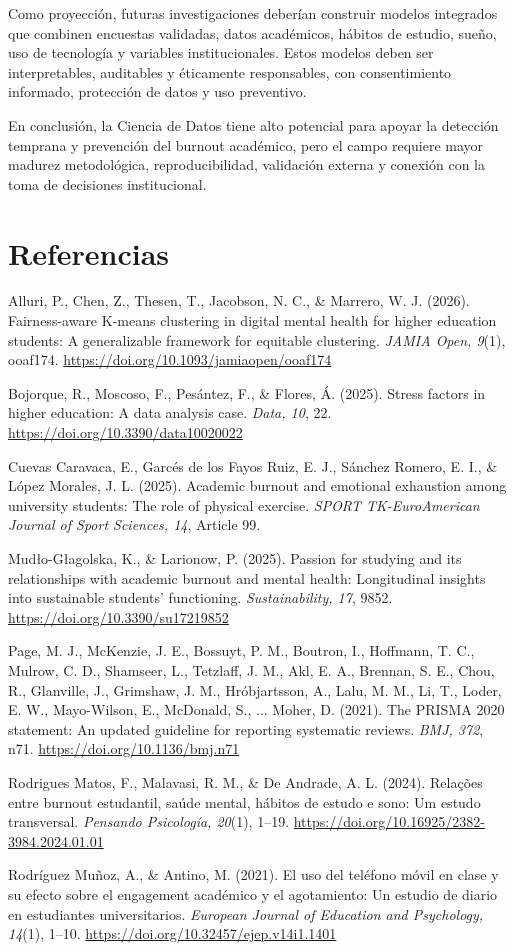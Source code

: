 \documentclass[12pt,a4paper]{article}
\newcommand{\apaRef}[1]{\par\noindent\hangindent=1.27cm\hangafter=1 #1\par}
\begin{document}
Como proyección, futuras investigaciones deberían construir modelos integrados que combinen encuestas validadas, datos académicos, hábitos de estudio, sueño, uso de tecnología y variables institucionales. Estos modelos deben ser interpretables, auditables y éticamente responsables, con consentimiento informado, protección de datos y uso preventivo.

En conclusión, la Ciencia de Datos tiene alto potencial para apoyar la detección temprana y prevención del burnout académico, pero el campo requiere mayor madurez metodológica, reproducibilidad, validación externa y conexión con la toma de decisiones institucional.


\section*{Referencias}

\apaRef{Alluri, P., Chen, Z., Thesen, T., Jacobson, N. C., \& Marrero, W. J. (2026). Fairness-aware K-means clustering in digital mental health for higher education students: A generalizable framework for equitable clustering. \textit{JAMIA Open, 9}(1), ooaf174. \url{https://doi.org/10.1093/jamiaopen/ooaf174}}

\apaRef{Bojorque, R., Moscoso, F., Pesántez, F., \& Flores, Á. (2025). Stress factors in higher education: A data analysis case. \textit{Data, 10}, 22. \url{https://doi.org/10.3390/data10020022}}

\apaRef{Cuevas Caravaca, E., Garcés de los Fayos Ruiz, E. J., Sánchez Romero, E. I., \& López Morales, J. L. (2025). Academic burnout and emotional exhaustion among university students: The role of physical exercise. \textit{SPORT TK-EuroAmerican Journal of Sport Sciences, 14}, Article 99.}

\apaRef{Mud\l{}o-G\l{}agolska, K., \& Larionow, P. (2025). Passion for studying and its relationships with academic burnout and mental health: Longitudinal insights into sustainable students' functioning. \textit{Sustainability, 17}, 9852. \url{https://doi.org/10.3390/su17219852}}

\apaRef{Page, M. J., McKenzie, J. E., Bossuyt, P. M., Boutron, I., Hoffmann, T. C., Mulrow, C. D., Shamseer, L., Tetzlaff, J. M., Akl, E. A., Brennan, S. E., Chou, R., Glanville, J., Grimshaw, J. M., Hróbjartsson, A., Lalu, M. M., Li, T., Loder, E. W., Mayo-Wilson, E., McDonald, S., ... Moher, D. (2021). The PRISMA 2020 statement: An updated guideline for reporting systematic reviews. \textit{BMJ, 372}, n71. \url{https://doi.org/10.1136/bmj.n71}}

\apaRef{Rodrigues Matos, F., Malavasi, R. M., \& De Andrade, A. L. (2024). Relações entre burnout estudantil, saúde mental, hábitos de estudo e sono: Um estudo transversal. \textit{Pensando Psicología, 20}(1), 1--19. \url{https://doi.org/10.16925/2382-3984.2024.01.01}}

\apaRef{Rodríguez Muñoz, A., \& Antino, M. (2021). El uso del teléfono móvil en clase y su efecto sobre el engagement académico y el agotamiento: Un estudio de diario en estudiantes universitarios. \textit{European Journal of Education and Psychology, 14}(1), 1--10. \url{https://doi.org/10.32457/ejep.v14i1.1401}}
\end{document}
